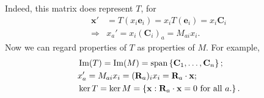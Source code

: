 \documentclass[a4paper]{article}
\begin{document}
Indeed, this matrix does represent $T$, for
\[
  \begin{aligned}
    \mathbf{x}'&=T(x_i \mathbf{e}_i)=x_iT(\mathbf{e}_i)=x_i \mathbf{C}_i \\
    \Longrightarrow & x_a'=x_i (\mathbf{C}_i)_a=M_{ai}x_i.
  \end{aligned}
\]
Now we can regard properties of $T$ as properties of $M$. For example,
\[
  \begin{aligned}
    & \operatorname{Im}(T)=\operatorname{Im}(M)=\operatorname{span}\left\{ \mathbf{C}_1,\dots, \mathbf{C}_n\right\};\\
    & x_a'=M_{ai}x_i=(\mathbf{R}_{a})_ix_i= \mathbf{R}_a\cdot \mathbf{x};\\
    & \ker T = \ker M=\left\{ \mathbf{x}:\mathbf{R}_a\cdot
    \mathbf{x}=0 \text{ for all }a.\right\}.\\
  \end{aligned}
\]
\end{document}
